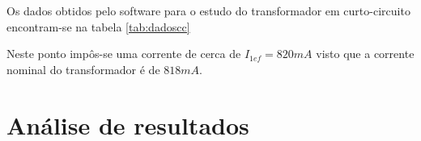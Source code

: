 \documentclass[%
  reprint,
  nofootinbib,
  amsmath,amssymb,
  aps,
  10pt,
]{revtex4-1}
\begin{document}
Os dados obtidos pelo software para o estudo do transformador em curto-circuito encontram-se na tabela \ref{tab:dadoscc}

Neste ponto impôs-se uma corrente de cerca de $I_{1ef}=820mA$ visto que a corrente nominal do transformador é de $818mA$.

\section{Análise de resultados}
\label{s:aresul}
\end{document}
